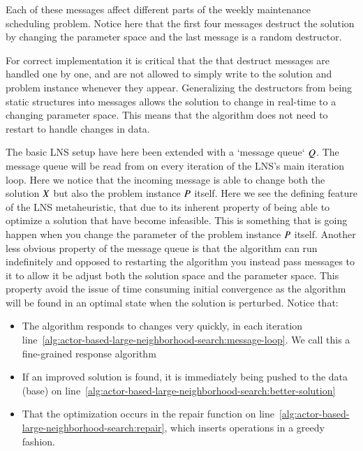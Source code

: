 Each of these messages affect different parts of the weekly maintenance scheduling 
problem. Notice here that the first four messages destruct the solution by
changing the parameter space and the last message is a random destructor.

For correct implementation it is critical that the that destruct messages are 
handled one by one, and are not allowed to simply write to the solution and
problem instance whenever they appear.
Generalizing the destructors from being static structures into messages allows
the solution to change in real-time to a changing parameter space. This means
that the algorithm does not need to restart to handle changes in data.



The basic LNS setup have here been extended with a `message queue` $Q$. The message
queue will be read from on every iteration of the LNS's main iteration loop.
Here we notice that the incoming message is able to change both the solution $X$
but also the problem instance $P$ itself. Here we see the defining feature
of the LNS metaheuristic, that due to its inherent property of being
able to optimize a solution that have become infeasible. This is something
that is going happen when you change the parameter of the problem
instance $P$ itself. Another less obvious property of the message queue is 
that the algorithm can run indefinitely and opposed to restarting the algorithm you
instead pass messages to it to allow it be adjust both the solution space and
the parameter space. This property avoid the issue of time consuming initial
convergence as the algorithm will be found in an optimal state when the
solution is perturbed. Notice that:

\begin{itemize}
    \item The algorithm responds to changes very quickly, in each iteration line~\ref{alg:actor-based-large-neighborhood-search:message-loop}. We call this a fine-grained response algorithm
    \item If an improved solution is found, it is immediately being pushed to the data (base) on line~\ref{alg:actor-based-large-neighborhood-search:better-solution}
    \item That the optimization occurs in the repair function on line~\ref{alg:actor-based-large-neighborhood-search:repair}, which inserts operations in a greedy fashion. 
\end{itemize}


